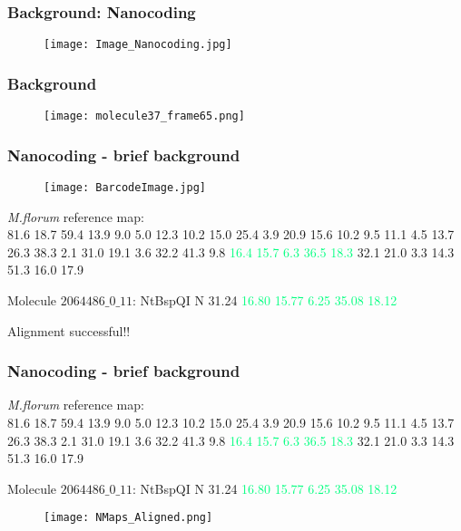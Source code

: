 \documentclass[10pt,dvipsnames,table, notes]{beamer}
\begin{document}
\begin{frame}
\frametitle{Background: Nanocoding}
\begin{figure}[T]
\texttt{[image: Image\_Nanocoding.jpg]}
\end{figure}

\end{frame}

\begin{frame}
\frametitle{Background}
\begin{figure}[T]
\texttt{[image: molecule37\_frame65.png]}
\end{figure}
\end{frame}

\begin{frame}
\frametitle{Nanocoding - brief background}
\begin{figure}[T]
\texttt{[image: BarcodeImage.jpg]}
\end{figure}

{\emph{M.florum}} reference map: \\
81.6 18.7 59.4 13.9 9.0 5.0 12.3 10.2 15.0 25.4 3.9 20.9 15.6 10.2 9.5 11.1 4.5 
13.7 26.3 38.3 2.1 31.0 19.1 3.6 32.2 41.3 9.8 \textcolor<3>{SpringGreen}{16.4 15.7 6.3 36.5 18.3} 32.1 21.0 
3.3 14.3 51.3 16.0 17.9

\pause
Molecule $2064486\_0\_11$: NtBspQI N  31.24  \textcolor<3>{SpringGreen}{16.80  15.77  6.25  35.08  18.12}

Alignment successful!!
\end{frame}

\begin{frame}
\frametitle{Nanocoding - brief background}
{\emph{M.florum}} reference map: \\
81.6 18.7 59.4 13.9 9.0 5.0 12.3 10.2 15.0 25.4 3.9 20.9 15.6 10.2 9.5 11.1 4.5 
13.7 26.3 38.3 2.1 31.0 19.1 3.6 32.2 41.3 9.8 \textcolor{SpringGreen}{16.4 15.7 6.3 36.5 18.3} 32.1 21.0 
3.3 14.3 51.3 16.0 17.9

Molecule $2064486\_0\_11$: NtBspQI N  31.24  \textcolor{SpringGreen}{16.80  15.77  6.25  35.08  18.12}

\begin{figure}[T]
\texttt{[image: NMaps\_Aligned.png]}
\end{figure}

\end{frame}
\end{document}
